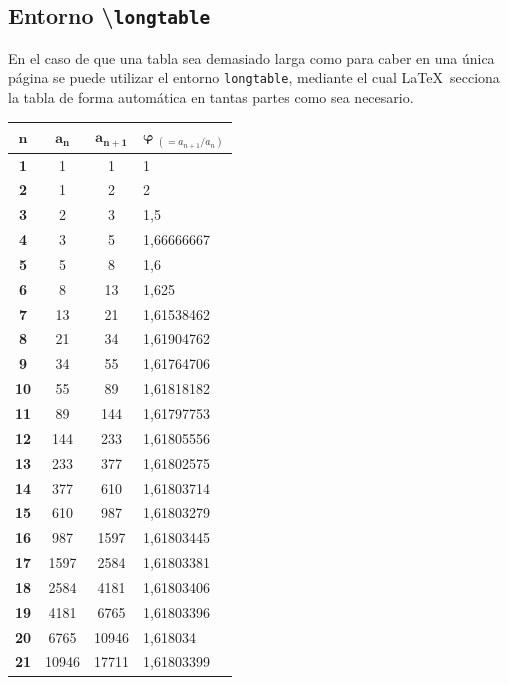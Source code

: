 \newpage
\subsection{Entorno \textbackslash\texttt{longtable}}

En el caso de que una tabla sea demasiado larga como para caber en una única página se puede utilizar el entorno \texttt{longtable}, mediante el cual \LaTeX \ secciona la tabla de forma automática en tantas partes como sea necesario.

\vspace{10pt}

\begin{longtable}[H]{|c|c|c|l|}
\hline
$\bm{n}$ & $\bm{a_n}$ & $\bm{a_{n+1}}$ & $\bm{\varphi} \ _{(= a_{n+1}/a_n)}$ \\ \hline\hline
\endhead
\textbf{1} & 1 & 1 & 1 \\ \hline
\textbf{2} & 1 & 2 & 2 \\ \hline
\textbf{3} & 2 & 3 & 1,5 \\ \hline
\textbf{4} & 3 & 5 & 1,66666667 \\ \hline
\textbf{5} & 5 & 8 & 1,6 \\ \hline
\textbf{6} & 8 & 13 & 1,625 \\ \hline
\textbf{7} & 13 & 21 & 1,61538462 \\ \hline
\textbf{8} & 21 & 34 & 1,61904762 \\ \hline
\textbf{9} & 34 & 55 & 1,61764706 \\ \hline
\textbf{10} & 55 & 89 & 1,61818182 \\ \hline
\textbf{11} & 89 & 144 & 1,61797753 \\ \hline
\textbf{12} & 144 & 233 & 1,61805556 \\ \hline
\textbf{13} & 233 & 377 & 1,61802575 \\ \hline
\textbf{14} & 377 & 610 & 1,61803714 \\ \hline
\textbf{15} & 610 & 987 & 1,61803279 \\ \hline
\textbf{16} & 987 & 1597 & 1,61803445 \\ \hline
\textbf{17} & 1597 & 2584 & 1,61803381 \\ \hline
\textbf{18} & 2584 & 4181 & 1,61803406 \\ \hline
\textbf{19} & 4181 & 6765 & 1,61803396 \\ \hline
\textbf{20} & 6765 & 10946 & 1,618034 \\ \hline
\textbf{21} & 10946 & 17711 & 1,61803399 \\ \hline

\end{longtable}
